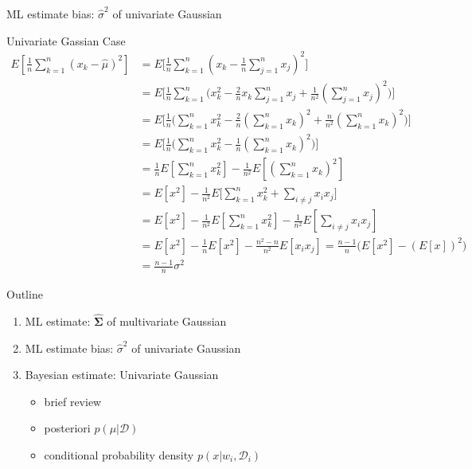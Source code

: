 \documentclass[compress,blue]{beamer}
\newcommand{\bSig}{\mathbf{\Sigma}}
\newcommand{\calD}{\mathcal{D}}
\begin{document}
\begin{frame}{ML estimate bias: $\hat{\sigma}^2$ of univariate Gaussian}
	\begin{block}{Univariate Gassian Case}
		\vspace{-0.15in}
		\tiny
		\begin{align}
			E[\frac{1}{n}\sum_{k=1}^{n}(x_k-\hat{\mu})^2] &= E\Big[\frac{1}{n}\sum_{k=1}^{n}(x_k-\frac{1}{n}\sum_{j=1}^n x_j)^2\Big]\\
			&=E\Big[\frac{1}{n}\sum_{k=1}^{n}\big(x^2_k -\frac{2}{n}x_k\sum_{j=1}^n x_j + \frac{1}{n^2}(\sum_{j=1}^n x_j)^2\big)\Big]\\
			&=E\Big[\frac{1}{n}\Big(\sum_{k=1}^{n} x^2_k -\frac{2}{n}(\sum_{k=1}^n x_k)^2 + \frac{n}{n^2}(\sum_{k=1}^n x_k)^2\Big)\Big]\\
			&=E\Big[\frac{1}{n}\Big(\sum_{k=1}^{n} x^2_k -\frac{1}{n}(\sum_{k=1}^n x_k)^2 \Big)\Big] \\
			&=\frac{1}{n}E[\sum_{k=1}^{n} x^2_k] - \frac{1}{n^2}E[(\sum_{k=1}^n x_k)^2]\\
			&=E[x^2] - \frac{1}{n^2}E\Big[\sum_{k=1}^n x_k^2 + \sum_{i\neq j}x_i x_j\Big] \\
			&= E[x^2] - \frac{1}{n^2}E[\sum_{k=1}^n x_k^2] - \frac{1}{n^2}E[\sum_{i\neq j}x_i x_j] \\
			&= E[x^2] -\frac{1}{n} E[x^2] - \frac{n^2-n}{n^2}E[x_i x_j] = \frac{n-1}{n}\Big(E[x^2] - (E[x])^2\Big)\\
			& = \frac{n-1}{n} \sigma^2
		\end{align}
		\normalsize
	\end{block}
\end{frame}

\begin{frame}{Outline}
	\begin{enumerate}
		\item<1-> ML estimate: $\hat{\bSig}$ of multivariate Gaussian 
		\vspace{0.1in}
		\item<1-> ML estimate bias: $\hat{\sigma}^2$ of univariate Gaussian
		\vspace{0.1in}
		\item<2-> Bayesian estimate: Univariate Gaussian
		\begin{itemize}
			\item<3-> brief review
			\item<0> posteriori $p(\mu|\calD)$
			\item<0> conditional probability density $p(x | w_i, \calD_i)$
		\end{itemize}
	\end{enumerate}
\end{frame}
\end{document}
